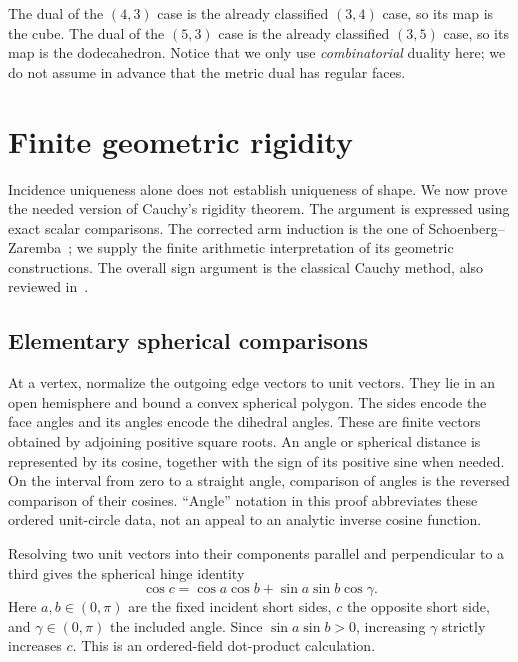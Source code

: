 The dual of the $(4,3)$ case is the already classified $(3,4)$ case,
so its map is the cube. The dual of the $(5,3)$ case is the already
classified $(3,5)$ case, so its map is the dodecahedron. Notice that
we only use \emph{combinatorial} duality here; we do not assume in
advance that the metric dual has regular faces.

\section{Finite geometric rigidity}\label{sec:rigidity}

Incidence uniqueness alone does not establish uniqueness of shape.
We now prove the needed version of Cauchy's rigidity theorem. The
argument is expressed using exact scalar comparisons. The corrected
arm induction is the one of Schoenberg--Zaremba~\cite{sz}; we supply
the finite arithmetic interpretation of its geometric constructions.
The overall sign argument is the classical Cauchy method, also
reviewed in~\cite{bowers}.

\subsection{Elementary spherical comparisons}

At a vertex, normalize the outgoing edge vectors to unit vectors.
They lie in an open hemisphere and bound a convex spherical polygon.
The sides encode the face angles and its angles encode the dihedral
angles. These are finite vectors obtained by adjoining positive
square roots. An angle or spherical distance is represented by its
cosine, together with the sign of its positive sine when needed.
On the interval from zero to a straight angle, comparison of angles
is the reversed comparison of their cosines. ``Angle'' notation in
this proof abbreviates these ordered unit-circle data, not an appeal
to an analytic inverse cosine function.

Resolving two unit vectors into their components parallel and
perpendicular to a third gives the spherical hinge identity
\begin{equation}\label{eq:hinge}
 \cos c=\cos a\cos b+\sin a\sin b\cos\gamma.
\end{equation}
Here $a,b\in(0,\pi)$ are the fixed incident short sides, $c$ the
opposite short side, and $\gamma\in(0,\pi)$ the included angle.
Since $\sin a\sin b>0$, increasing $\gamma$ strictly increases $c$.
This is an ordered-field dot-product calculation.

